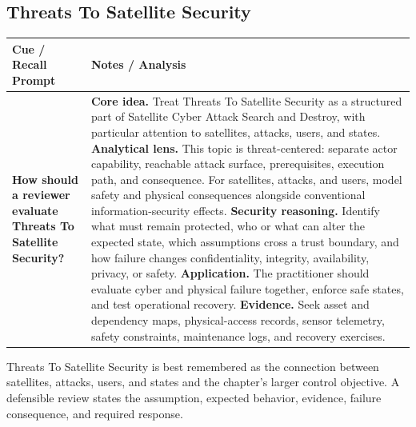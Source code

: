 \documentclass[11pt]{article}
\newcommand{\CornellHeader}{%
\rowcolor{Navy}\color{white}\bfseries Cue / Recall Prompt & \color{white}\bfseries Notes / Analysis\\\hline}
\newcommand{\CornellRow}[2]{%
\cellcolor{CueGray}\RaggedRight\textbf{#1} & \RaggedRight #2\\\hline}
\begin{document}
\subsection*{Threats To Satellite Security}
\begin{longtable}{>{\RaggedRight\arraybackslash}p{}|>{\RaggedRight\arraybackslash}p{}}
\CornellHeader
\CornellRow{How should a reviewer evaluate Threats To Satellite Security?}{\textbf{Core idea.} Treat Threats To Satellite Security as a structured part of Satellite Cyber Attack Search and Destroy, with particular attention to satellites, attacks, users, and states. \textbf{Analytical lens.} This topic is threat-centered: separate actor capability, reachable attack surface, prerequisites, execution path, and consequence. For satellites, attacks, and users, model safety and physical consequences alongside conventional information-security effects. \textbf{Security reasoning.} Identify what must remain protected, who or what can alter the expected state, which assumptions cross a trust boundary, and how failure changes confidentiality, integrity, availability, privacy, or safety. \textbf{Application.} The practitioner should evaluate cyber and physical failure together, enforce safe states, and test operational recovery. \textbf{Evidence.} Seek asset and dependency maps, physical-access records, sensor telemetry, safety constraints, maintenance logs, and recovery exercises.}
\end{longtable}
\begin{topicsummary}
Threats To Satellite Security is best remembered as the connection between satellites, attacks, users, and states and the chapter's larger control objective. A defensible review states the assumption, expected behavior, evidence, failure consequence, and required response.
\end{topicsummary}
\end{document}

